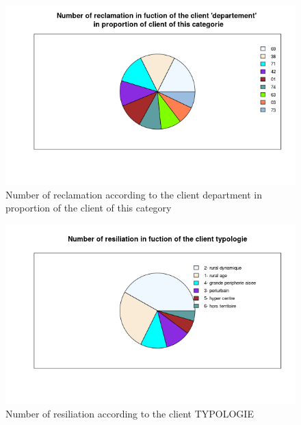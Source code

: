 \documentclass[a4paper, 11pt]{article}
\begin{document}
    \begin{figure}[!ht]
    	\centering
            \includegraphics[height = 10 cm]{Valentin/Number_of_reclamation_in_fuction_of_the_client_departement_proportion.png}
            \caption{Number of reclamation according to the client department in proportion of the client of this category}
            \label{fig:reclamtion_dep3}
    \end{figure}
    
    

    \begin{figure}[!ht]
    	\centering
            \includegraphics[height = 10 cm]{Valentin/Number_of_resiliation_in_fuction_of_the_client_typologie.png}
            \caption{Number of resiliation according to the client TYPOLOGIE}
            \label{fig:resiliation_typo1}
    \end{figure}
    
\end{document}

